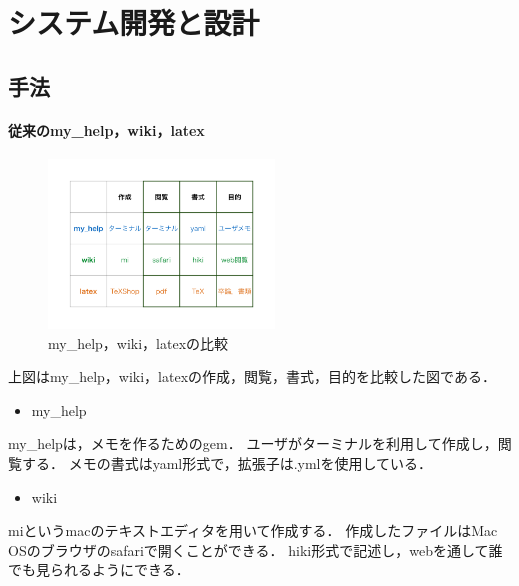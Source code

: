 \section{システム開発と設計}

\subsection{手法}

\paragraph {従来のmy\_help，wiki，latex}
\begin{figure}[htbp]\begin{center}
\includegraphics[width=6cm,bb=100 100 600 700]{my_help2hiki_saki.003.png}
\caption{ my\_help，wiki，latexの比較}
\label{default}\end{center}\end{figure}
\begin{description}
\item 上図はmy\_help，wiki，latexの作成，閲覧，書式，目的を比較した図である．
\end{description}
\begin{itemize}
\item my\_help
\end{itemize}
\begin{description}
\item my\_helpは，メモを作るためのgem．
ユーザがターミナルを利用して作成し，閲覧する．
メモの書式はyaml形式で，拡張子は.ymlを使用している．
\end{description}

\begin{itemize}
\item wiki
\end{itemize}
\begin{description}
\item miというmacのテキストエディタを用いて作成する．
作成したファイルはMac OSのブラウザのsafariで開くことができる．
hiki形式で記述し，webを通して誰でも見られるようにできる．
\end{description}

